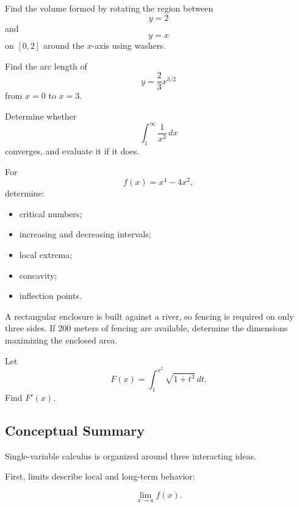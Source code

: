 \begin{exercise}[2]
Find the volume formed by rotating the region between
\[ y=2 \]
and
\[ y=x \]
on \([0,2]\) around the \(x\)-axis using washers.
\end{exercise}

\begin{exercise}[2]
Find the arc length of
\[ y=\frac23x^{3/2} \]
from \(x=0\) to \(x=3\).
\end{exercise}

\begin{exercise}[2]
Determine whether
\[ \int_1^\infty\frac1{x^3}\,dx \]
converges, and evaluate it if it does.
\end{exercise}

\begin{exercise}[3]
For
\[ f(x)=x^4-4x^2, \]
determine:
\begin{itemize}
    \item critical numbers;
    \item increasing and decreasing intervals;
    \item local extrema;
    \item concavity;
    \item inflection points.
\end{itemize}
\end{exercise}

\begin{exercise}[3]
A rectangular enclosure is built against a river, so fencing is required
on only three sides. If \(200\) meters of fencing are available, determine
the dimensions maximizing the enclosed area.
\end{exercise}

\begin{exercise}[3]
Let
\[ F(x)=\int_1^{x^2}\sqrt{1+t^3}\,dt. \]
Find \(F'(x)\).
\end{exercise}

\subsection{Conceptual Summary}
\label{subsec:single-variable-summary}

Single-variable calculus is organized around three interacting ideas.

First, limits describe local and long-term behavior:

\[ \lim_{x\to a}f(x). \]


